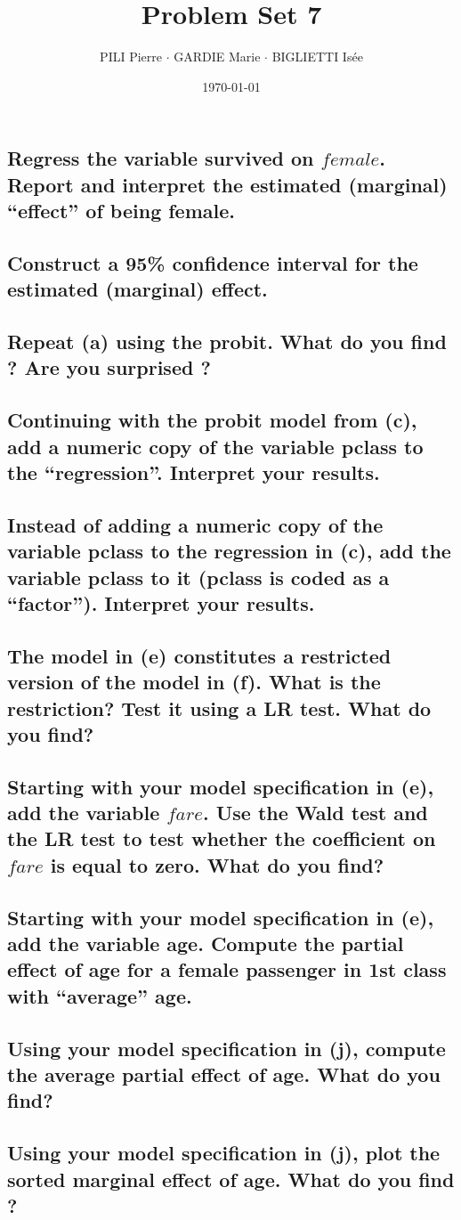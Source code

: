 \documentclass[12pt]{article}
\title{Problem Set 7}
\author{PILI Pierre $\cdot$ GARDIE Marie $\cdot$ BIGLIETTI Isée}
\date{\today}
\renewcommand{\thesubsection}{\arabic{section}.\arabic{subsection}}
\begin{document}
\maketitle
\renewcommand{\thesubsection}{\alph{subsection}}

\subsection{Regress the variable survived on $female$. Report and interpret the estimated (marginal) “effect” of being female.}

\subsection{Construct a 95\% confidence interval for the estimated (marginal) effect.}
\subsection{Repeat (a) using the probit. What do you find ? Are you surprised ?}
\subsection{Continuing with the probit model from (c), add a numeric copy of the variable pclass to the “regression”. Interpret your results.}
\subsection{Instead of adding a numeric copy of the variable pclass to the regression in (c), add the variable pclass to it (pclass is coded as a “factor”). Interpret your results.}
\subsection{The model in (e) constitutes a restricted version of the model in (f). What is the restriction? Test it using a LR test. What do you find?}
\subsection{Starting with your model specification in (e), add the variable $fare$. Use the Wald test and the LR test to test whether the coefficient on $fare$ is equal to zero. What do you find?}
\subsection{Starting with your model specification in (e), add the variable age. Compute the partial effect of age for a female passenger in 1st class with “average” age.}
\subsection{Using your model specification in (j), compute the average partial effect of age. What do you find?}
\subsection{Using your model specification in (j), plot the sorted marginal effect of age. What do you find ?}
\end{document}
